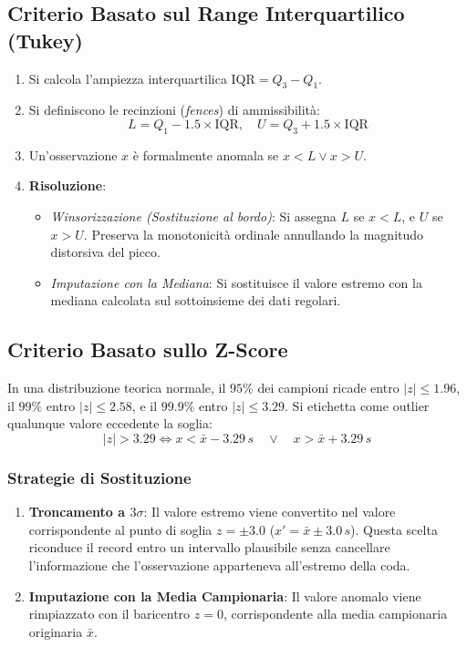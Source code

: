 \subsection{Criterio Basato sul Range Interquartilico (Tukey)}
\begin{enumerate}
    \item Si calcola l'ampiezza interquartilica $\text{IQR} = Q_3 - Q_1$.
    \item Si definiscono le recinzioni (\textit{fences}) di ammissibilità:
    \begin{equation}
        L = Q_1 - 1.5 \times \text{IQR}, \quad U = Q_3 + 1.5 \times \text{IQR}
    \end{equation}
    \item Un'osservazione $x$ è formalmente anomala se $x < L \lor x > U$.
    \item \textbf{Risoluzione}:
    \begin{itemize}[noitemsep]
        \item \textit{Winsorizzazione (Sostituzione al bordo)}: Si assegna $L$ se $x < L$, e $U$ se $x > U$. Preserva la monotonicità ordinale annullando la magnitudo distorsiva del picco.
        \item \textit{Imputazione con la Mediana}: Si sostituisce il valore estremo con la mediana calcolata sul sottoinsieme dei dati regolari.
    \end{itemize}
\end{enumerate}

\subsection{Criterio Basato sullo Z-Score}
In una distribuzione teorica normale, il $95\%$ dei campioni ricade entro $|z| \le 1.96$, il $99\%$ entro $|z| \le 2.58$, e il $99.9\%$ entro $|z| \le 3.29$.
Si etichetta come outlier qualunque valore eccedente la soglia:
\begin{equation}
    |z| > 3.29 \iff x < \bar{x} - 3.29\,s \quad \lor \quad x > \bar{x} + 3.29\,s
\end{equation}

\subsubsection{Strategie di Sostituzione}
\begin{enumerate}
    \item \textbf{Troncamento a $3\sigma$}: Il valore estremo viene convertito nel valore corrispondente al punto di soglia $z = \pm 3.0$ ($x' = \bar{x} \pm 3.0\,s$). Questa scelta riconduce il record entro un intervallo plausibile senza cancellare l'informazione che l'osservazione apparteneva all'estremo della coda.
    \item \textbf{Imputazione con la Media Campionaria}: Il valore anomalo viene rimpiazzato con il baricentro $z = 0$, corrispondente alla media campionaria originaria $\bar{x}$.
\end{enumerate}

